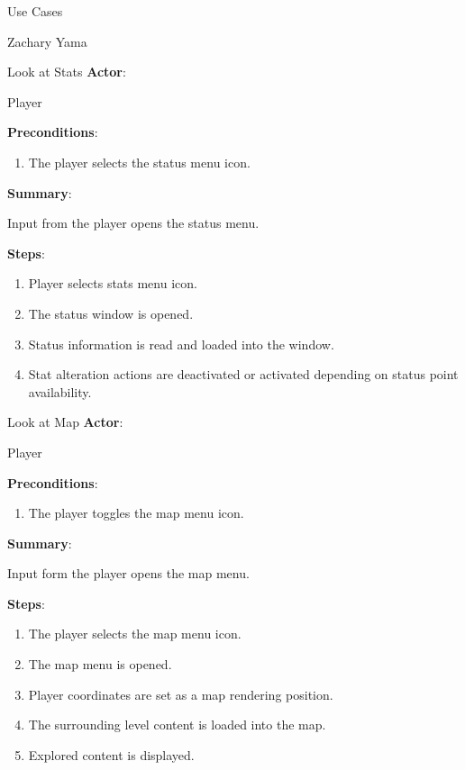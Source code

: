 \documentclass[12pt]{report}
\begin{document}
\begin{section}{Use Cases}
\begin{subsection}{Zachary Yama}
\begin{subsubsection}{Look at Stats}
\textbf{Actor}:

Player

\textbf{Preconditions}:

\begin{enumerate}
\item The player selects the status menu icon.
\end{enumerate}

\textbf{Summary}:

Input from the player opens the status menu.

\textbf{Steps}:

\begin{enumerate}
\item Player selects stats menu icon.
\item The status window is opened.
\item Status information is read and loaded into the window.
\item Stat alteration actions are deactivated or activated depending on
status point availability.
\end{enumerate}
\end{subsubsection}

\begin{subsubsection}{Look at Map}
\textbf{Actor}:

Player

\textbf{Preconditions}:

\begin{enumerate}
\item The player toggles the map menu icon.
\end{enumerate}

\textbf{Summary}:

Input form the player opens the map menu.

\textbf{Steps}:

\begin{enumerate}
\item The player selects the map menu icon.
\item The map menu is opened.
\item Player coordinates are set as a map rendering position.
\item The surrounding level content is loaded into the map.
\item Explored content is displayed.
\end{enumerate}
\end{subsubsection}


\end{subsection}
\end{section}
\end{document}
